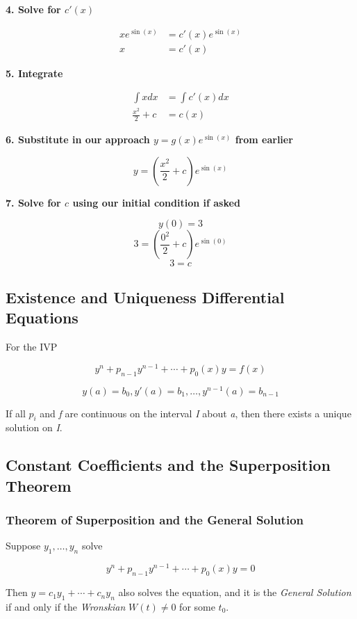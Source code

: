 \textbf{4. Solve for \(c'(x)\)}

\begin{align*}
    xe^{\sin(x)} &= c'(x)e^{\sin(x)}\\
    x &= c'(x)
\end{align*}

\textbf{5. Integrate}

\begin{align*}
    \int x dx &= \int c'(x)dx\\
    \frac{x^2}{2} + c &= c(x)
\end{align*}

\textbf{6. Substitute in our approach \(y = g(x)e^{\sin(x)}\) from earlier}

\[
    y = \left(\frac{x^2}{2} + c\right)e^{\sin(x)}
\]

\textbf{7. Solve for \(c\) using our initial condition if asked}

\[
    y(0) = 3
\]
\[
    3 = \left(\frac{0^2}{2} + c\right)e^{\sin(0)}
\]
\[
    3 = c
\]

\subsection{Existence and Uniqueness Differential Equations}

For the IVP

\[
    y^{n} + p_{n - 1}y^{n - 1}+ \cdots + p_0 (x)y = f(x)
\]

\[
    y(a) = b_0, y'(a) = b_1, \dots, y^{n - 1}(a) = b_{n - 1}
\]

If all \(p_i\) and \emph{f} are continuous on the interval \emph{I} about \emph{a}, then
there exists a unique solution on \emph{I}.

\subsection{Constant Coefficients and the Superposition Theorem}

\subsubsection{Theorem of Superposition and the General Solution}

Suppose \(y_1, \dots, y_n\) solve 

\[
    y^{n} + p_{n - 1}y^{n - 1}+ \cdots + p_0 (x)y = 0
\]

Then \(y = c_1 y_1 + \cdots + c_n y_n\) also solves the equation, and it is the 
\emph{General Solution} if and only if the \emph{Wronskian} \(W(t) \ne 0\) for some \(t_0\).


